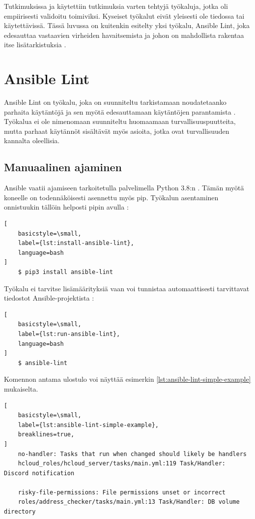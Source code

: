 Tutkimuksissa \parencite{RahmanAkond2019TSSS} ja \parencite{RahmanAkond2021SSiA} käytettiin
tutkimuksia varten tehtyjä työkaluja, jotka oli empiirisesti validoitu toimiviksi.
Kyseiset työkalut eivät yleisesti ole tiedossa tai käytettävissä. Tässä luvussa on
kuitenkin esitelty yksi työkalu, Ansible Lint, joka edesauttaa vastaavien virheiden
havaitsemista ja johon on mahdollista rakentaa itse lisätarkistuksia \parencite{SestoVincent2020ATaV}.

\section{Ansible Lint}

Ansible Lint on työkalu, joka on suunniteltu tarkistamaan noudatetaanko parhaita
käytäntöjä ja sen myötä edesauttamaan käytäntöjen parantamista \parencite{GithubAnsibleLint}.
Työkalua ei ole nimenomaan suunniteltu huomaamaan turvallisuuspuutteita, mutta parhaat
käytännöt sisältävät myös asioita, jotka ovat turvallisuuden kannalta oleellisia.

\subsection{Manuaalinen ajaminen}

Ansible vaatii ajamiseen tarkoitetulla palvelimella Python 3.8:n \parencite{AnsibleDocs}.
Tämän myötä koneelle on todennäköisesti asennettu myös pip. Työkalun asentaminen
onnistuukin tällöin helposti pipin avulla \parencite{AnsibleLintReadTheDocs}:

\begin{lstlisting}[
    basicstyle=\small,
    label={lst:install-ansible-lint},
    language=bash
]
    $ pip3 install ansible-lint
\end{lstlisting}

Työkalu ei tarvitse lisämäärityksiä vaan voi tunnistaa automaattisesti tarvittavat
tiedostot Ansible-projektista \parencite{AnsibleLintReadTheDocs}:

\begin{lstlisting}[
    basicstyle=\small,
    label={lst:run-ansible-lint},
    language=bash
]
    $ ansible-lint
\end{lstlisting}

Komennon antama ulostulo voi näyttää esimerkin \ref{lst:ansible-lint-simple-example} mukaiselta.

\begin{lstlisting}[
    basicstyle=\small,
    label={lst:ansible-lint-simple-example},
    breaklines=true,
]
    no-handler: Tasks that run when changed should likely be handlers
    hcloud_roles/hcloud_server/tasks/main.yml:119 Task/Handler: Discord notification

    risky-file-permissions: File permissions unset or incorrect
    roles/address_checker/tasks/main.yml:13 Task/Handler: DB volume directory
\end{lstlisting}

